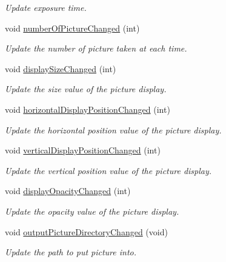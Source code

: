 \begin{DoxyCompactItemize}
\begin{DoxyCompactList}\small\item\em Update exposure time. \end{DoxyCompactList}\item 
void \mbox{\hyperlink{class_autoscope_window_form_afa0e563f29e92ef54caf172e6bdd53e2}{number\+Of\+Picture\+Changed}} (int)
\begin{DoxyCompactList}\small\item\em Update the number of picture taken at each time. \end{DoxyCompactList}\item 
void \mbox{\hyperlink{class_autoscope_window_form_a20119c95db0bc44f6e7fffc49f230af0}{display\+Size\+Changed}} (int)
\begin{DoxyCompactList}\small\item\em Update the size value of the picture display. \end{DoxyCompactList}\item 
void \mbox{\hyperlink{class_autoscope_window_form_a084c9da4dd3374105e3dd0302e5db578}{horizontal\+Display\+Position\+Changed}} (int)
\begin{DoxyCompactList}\small\item\em Update the horizontal position value of the picture display. \end{DoxyCompactList}\item 
void \mbox{\hyperlink{class_autoscope_window_form_a775044eeb0c9bf094512c82d2c538ad0}{vertical\+Display\+Position\+Changed}} (int)
\begin{DoxyCompactList}\small\item\em Update the vertical position value of the picture display. \end{DoxyCompactList}\item 
void \mbox{\hyperlink{class_autoscope_window_form_ac76b6ed3d0bd679c7342eb15bf217418}{display\+Opacity\+Changed}} (int)
\begin{DoxyCompactList}\small\item\em Update the opacity value of the picture display. \end{DoxyCompactList}\item 
void \mbox{\hyperlink{class_autoscope_window_form_ac44f36cc4ccc68c6109d1c18ab7ba107}{output\+Picture\+Directory\+Changed}} (void)
\begin{DoxyCompactList}\small\item\em Update the path to put picture into. \end{DoxyCompactList}\item 

\end{DoxyCompactItemize}
